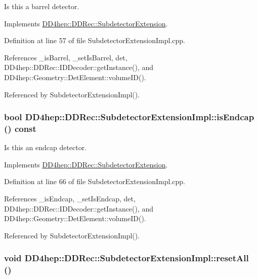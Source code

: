 Is this a barrel detector. 

Implements \hyperlink{class_d_d4hep_1_1_d_d_rec_1_1_subdetector_extension_a12be99462aa14feba6df7eed02468994}{DD4hep::DDRec::SubdetectorExtension}.

Definition at line 57 of file SubdetectorExtensionImpl.cpp.

References \_\-isBarrel, \_\-setIsBarrel, det, DD4hep::DDRec::IDDecoder::getInstance(), and DD4hep::Geometry::DetElement::volumeID().

Referenced by SubdetectorExtensionImpl().\hypertarget{class_d_d4hep_1_1_d_d_rec_1_1_subdetector_extension_impl_a2f282d14ec8c7f72fe996722df3fb66f}{
\subsubsection[{isEndcap}]{\setlength{\rightskip}{0pt plus 5cm}bool DD4hep::DDRec::SubdetectorExtensionImpl::isEndcap () const}}
\label{class_d_d4hep_1_1_d_d_rec_1_1_subdetector_extension_impl_a2f282d14ec8c7f72fe996722df3fb66f}


Is this an endcap detector. 

Implements \hyperlink{class_d_d4hep_1_1_d_d_rec_1_1_subdetector_extension_a57a044e743f899391ac4a89fc0035e08}{DD4hep::DDRec::SubdetectorExtension}.

Definition at line 66 of file SubdetectorExtensionImpl.cpp.

References \_\-isEndcap, \_\-setIsEndcap, det, DD4hep::DDRec::IDDecoder::getInstance(), and DD4hep::Geometry::DetElement::volumeID().

Referenced by SubdetectorExtensionImpl().\hypertarget{class_d_d4hep_1_1_d_d_rec_1_1_subdetector_extension_impl_aadfe7c78e6a5d977d9d2f9d6a6222618}{
\subsubsection[{resetAll}]{\setlength{\rightskip}{0pt plus 5cm}void DD4hep::DDRec::SubdetectorExtensionImpl::resetAll ()}}
\label{class_d_d4hep_1_1_d_d_rec_1_1_subdetector_extension_impl_aadfe7c78e6a5d977d9d2f9d6a6222618}


